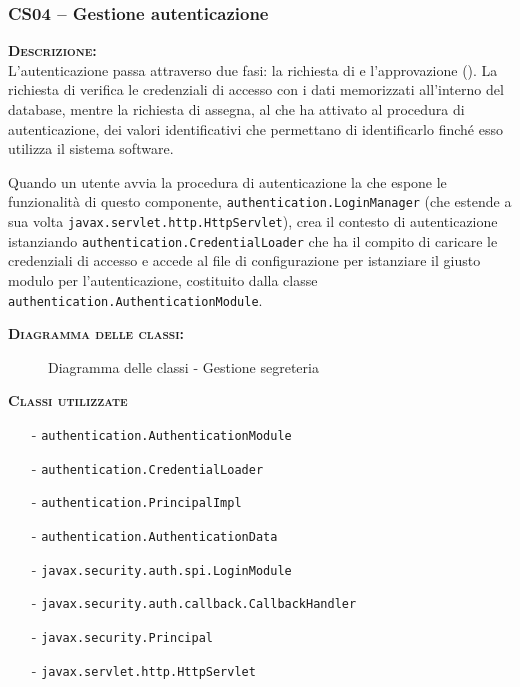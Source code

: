 \subsubsection{CS04 -- Gestione autenticazione}\label{sec:cs04}
\begin{description}
  \item{\scshape\bfseries Descrizione:}\\
L'autenticazione passa attraverso due fasi: la richiesta di  e l'approvazione (). La richiesta di  verifica le credenziali di accesso con i dati memorizzati all'interno del database, mentre la richiesta di  assegna, al  che ha attivato al procedura di autenticazione, dei valori identificativi che permettano di identificarlo finché esso utilizza il sistema software.

Quando un utente avvia la procedura di autenticazione la  che espone le funzionalità di questo componente, \texttt{authentication.LoginManager} (che estende a sua volta \texttt{javax.servlet.http.HttpServlet}), crea il contesto di autenticazione istanziando
\texttt{authentication.CredentialLoader} che ha il compito di caricare le credenziali di accesso e accede al file di configurazione per istanziare il giusto modulo per l'autenticazione, costituito dalla classe \texttt{authentication.AuthenticationModule}.
  
  \item{\scshape\bfseries Diagramma delle classi:}
\begin{figure}[H]
  \centering
  \caption{Diagramma delle classi - Gestione segreteria}\label{fig:gestioneautenticazione}
\end{figure}	
  
  \item{\scshape\bfseries Classi utilizzate}
  \begin{itemize}
    	\item[-] \texttt{authentication.AuthenticationModule}
	  	\item[-] \texttt{authentication.CredentialLoader}
	   	\item[-] \texttt{authentication.PrincipalImpl}
	  	\item[-] \texttt{authentication.AuthenticationData}
	  	\item[-] \texttt{javax.security.auth.spi.LoginModule}
	  	\item[-] \texttt{javax.security.auth.callback.CallbackHandler}
	  	\item[-] \texttt{javax.security.Principal}
	  	\item[-] \texttt{javax.servlet.http.HttpServlet}
  \end{itemize}

\end{description}

